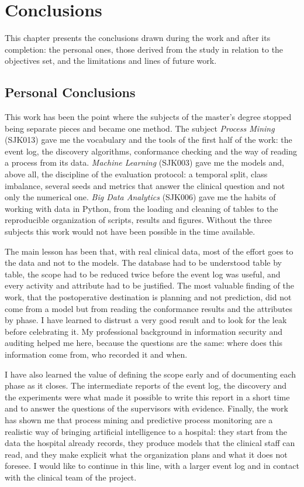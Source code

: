 \chapter{Conclusions}
\label{cap:conclusiones}

This chapter presents the conclusions drawn during the work and after its completion: the personal ones, those derived from the study in relation to the objectives set, and the limitations and lines of future work.

\section{Personal Conclusions}

This work has been the point where the subjects of the master's degree stopped being separate pieces and became one method. The subject \emph{Process Mining} (SJK013) gave me the vocabulary and the tools of the first half of the work: the event log, the discovery algorithms, conformance checking and the way of reading a process from its data. \emph{Machine Learning} (SJK003) gave me the models and, above all, the discipline of the evaluation protocol: a temporal split, class imbalance, several seeds and metrics that answer the clinical question and not only the numerical one. \emph{Big Data Analytics} (SJK006) gave me the habits of working with data in Python, from the loading and cleaning of tables to the reproducible organization of scripts, results and figures. Without the three subjects this work would not have been possible in the time available.

The main lesson has been that, with real clinical data, most of the effort goes to the data and not to the models. The database had to be understood table by table, the scope had to be reduced twice before the event log was useful, and every activity and attribute had to be justified. The most valuable finding of the work, that the postoperative destination is planning and not prediction, did not come from a model but from reading the conformance results and the attributes by phase. I have learned to distrust a very good result and to look for the leak before celebrating it. My professional background in information security and auditing helped me here, because the questions are the same: where does this information come from, who recorded it and when.

I have also learned the value of defining the scope early and of documenting each phase as it closes. The intermediate reports of the event log, the discovery and the experiments were what made it possible to write this report in a short time and to answer the questions of the supervisors with evidence. Finally, the work has shown me that process mining and predictive process monitoring are a realistic way of bringing artificial intelligence to a hospital: they start from the data the hospital already records, they produce models that the clinical staff can read, and they make explicit what the organization plans and what it does not foresee. I would like to continue in this line, with a larger event log and in contact with the clinical team of the project.

